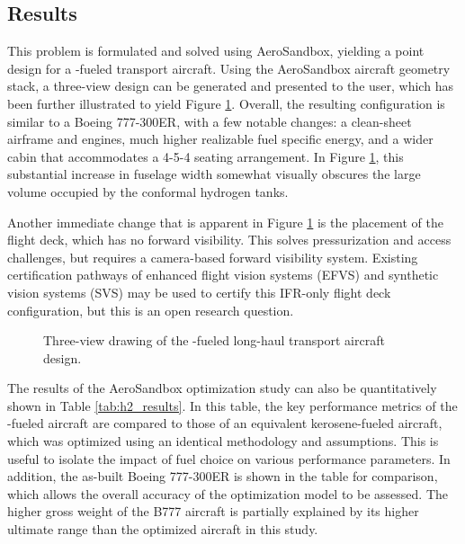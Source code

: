 \subsection{Results}

This problem is formulated and solved using AeroSandbox, yielding a point design for a \lh-fueled transport aircraft. Using the AeroSandbox aircraft geometry stack, a three-view design can be generated and presented to the user, which has been further illustrated to yield Figure \ref{fig:h2_three_view}. Overall, the resulting configuration is similar to a Boeing 777-300ER, with a few notable changes: a clean-sheet airframe and engines, much higher realizable fuel specific energy, and a wider cabin that accommodates a 4-5-4 seating arrangement. In Figure \ref{fig:h2_three_view}, this substantial increase in fuselage width somewhat visually obscures the large volume occupied by the conformal hydrogen tanks.

Another immediate change that is apparent in Figure \ref{fig:h2_three_view} is the placement of the flight deck, which has no forward visibility. This solves pressurization and access challenges, but requires a camera-based forward visibility system. Existing certification pathways of enhanced flight vision systems (EFVS) and synthetic vision systems (SVS) may be used to certify this IFR-only flight deck configuration, but this is an open research question.

\begin{figure}[H]
    \centering
    
    \caption{Three-view drawing of the \lh-fueled long-haul transport aircraft design.}
    \label{fig:h2_three_view}
\end{figure}

The results of the AeroSandbox optimization study can also be quantitatively shown in Table \ref{tab:h2_results}. In this table, the key performance metrics of the \lh-fueled aircraft are compared to those of an equivalent kerosene-fueled aircraft, which was optimized using an identical methodology and assumptions. This is useful to isolate the impact of fuel choice on various performance parameters. In addition, the as-built Boeing 777-300ER is shown in the table for comparison, which allows the overall accuracy of the optimization model to be assessed. The higher gross weight of the B777 aircraft is partially explained by its higher ultimate range than the optimized aircraft in this study.

